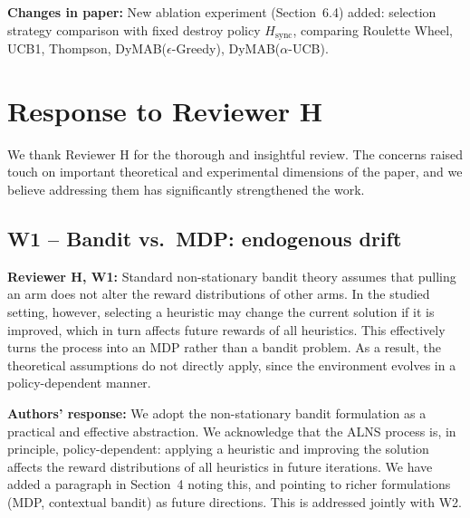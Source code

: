 \documentclass[review]{jair}
\begin{document}
\begin{changebox}
\textbf{Changes in paper:} New ablation experiment (Section~6.4) added: selection strategy comparison with fixed destroy policy $H_{\text{sync}}$, comparing Roulette Wheel, UCB1, Thompson, DyMAB($\epsilon$-Greedy), DyMAB($\alpha$-UCB).
\end{changebox}

\section*{Response to Reviewer H}

\noindent We thank Reviewer H for the thorough and insightful review. The concerns raised touch on important theoretical and experimental dimensions of the paper, and we believe addressing them has significantly strengthened the work.

\subsection*{W1 -- Bandit vs.\ MDP: endogenous drift}

\begin{reviewerbox}
\textbf{Reviewer H, W1:} Standard non-stationary bandit theory assumes that pulling an arm does not alter the reward distributions of other arms. In the studied setting, however, selecting a heuristic may change the current solution if it is improved, which in turn affects future rewards of all heuristics. This effectively turns the process into an MDP rather than a bandit problem. As a result, the theoretical assumptions do not directly apply, since the environment evolves in a policy-dependent manner.
\end{reviewerbox}

\begin{authorbox}
\textbf{Authors' response:} We adopt the non-stationary bandit formulation as a practical and effective abstraction. We acknowledge that the ALNS process is, in principle, policy-dependent: applying a heuristic and improving the solution affects the reward distributions of all heuristics in future iterations. We have added a paragraph in Section~4 noting this, and pointing to richer formulations (MDP, contextual bandit) as future directions. This is addressed jointly with W2.
\end{authorbox}
\end{document}
